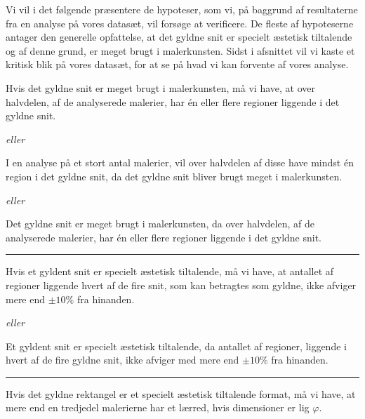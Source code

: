 {
{\sffamily Vi vil i det følgende præsentere de hypoteser, som vi, på
baggrund af resultaterne fra en analyse på vores datasæt, vil forsøge at
verificere. De fleste af hypoteserne antager den generelle opfattelse,
at det gyldne snit er specielt æstetisk tiltalende og af denne grund, er
meget brugt i malerkunsten. Sidst i afsnittet vil vi kaste et kritisk
blik på vores datasæt, for at se på hvad vi kan forvente af vores
analyse.
}

\begin{hypotese}
    Hvis det gyldne snit er meget brugt i malerkunsten, må vi have, at
    over halvdelen, af de analyserede malerier, har én eller flere
    regioner liggende i det gyldne snit.
\end{hypotese}

\emph{eller}

\begin{hypotese}
    I en analyse på et stort antal malerier, vil over halvdelen af disse
    have mindst én region i det gyldne snit, da det gyldne snit bliver
    brugt meget i malerkunsten.
\end{hypotese}

\emph{eller}

\begin{hypotese}
    Det gyldne snit er meget brugt i malerkunsten, da over halvdelen, af
    de analyserede malerier, har én eller flere regioner liggende i det
    gyldne snit.
\end{hypotese}

\hrule

\begin{hypotese}
    Hvis et gyldent snit er specielt æstetisk tiltalende, må vi have, at
    antallet af regioner liggende hvert af de fire snit, som kan
    betragtes som gyldne, ikke afviger mere end $\pm10\%$ fra hinanden.
\end{hypotese}

\emph{eller}

\begin{hypotese}
    Et gyldent snit er specielt æstetisk tiltalende, da antallet af
    regioner, liggende i hvert af de fire gyldne snit, ikke afviger med
    mere end $\pm10\%$ fra hinanden.
\end{hypotese}

\hrule

\begin{hypotese}
    Hvis det gyldne rektangel er et specielt æstetisk tiltalende format,
    må vi have, at mere end en tredjedel malerierne har et lærred, hvis
    dimensioner er lig $\varphi$.
\end{hypotese}

}
